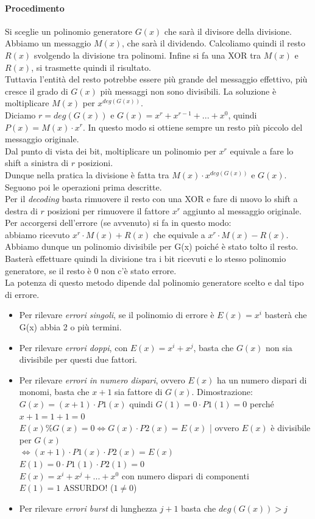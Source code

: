 \documentclass[10pt,a4paper,twoside]{article}
\begin{document}
\paragraph{Procedimento} Si sceglie un polinomio generatore $G(x)$ che sarà il divisore della divisione.\\
Abbiamo un messaggio $M(x)$, che sarà il dividendo. Calcoliamo quindi il resto $R(x)$ svolgendo la divisione tra polinomi. Infine si fa una XOR tra $M(x)$ e $R(x)$, si trasmette quindi il risultato.\\
Tuttavia l'entità del resto potrebbe essere più grande del messaggio effettivo, più cresce il grado di $G(x)$ più messaggi non sono divisibili. La soluzione è moltiplicare $M(x)$ per $x^{deg(G(x))}$.\\
Diciamo $r=deg(G(x))$ e $G(x)=x^r+x^{r-1}+...+x^0$, quindi $P(x)=M(x)\cdot x^r$. In questo modo si ottiene sempre un resto più piccolo del messaggio originale.\\
Dal punto di vista dei bit, moltiplicare un polinomio per $x^r$ equivale a fare lo shift a sinistra di $r$ posizioni.\\
Dunque nella pratica la divisione è fatta tra $M(x)\cdot x^{deg(G(x))}$ e $G(x)$. Seguono poi le operazioni prima descritte.\\
Per il \textit{decoding} basta rimuovere il resto con una XOR e fare di nuovo lo shift a destra di $r$ posizioni per rimuovere il fattore $x^r$ aggiunto al messaggio originale.\\
Per accorgersi dell'errore (se avvenuto) si fa in questo modo:\\
abbiamo ricevuto $x^r\cdot M(x)+R(x)$ che equivale a $x^r\cdot M(x)-R(x)$. Abbiamo dunque un polinomio divisibile per G(x) poiché è stato tolto il resto. Basterà effettuare quindi la divisione tra i bit ricevuti e lo stesso polinomio generatore, se il resto è 0 non c'è stato errore.\\
La potenza di questo metodo dipende dal polinomio generatore scelto e dal tipo di errore.
\begin{itemize}
\item Per rilevare \textit{errori singoli}, se il polinomio di errore è $E(x)=x^i$ basterà che G(x) abbia 2 o più termini.
\item Per rilevare \textit{errori doppi}, con $E(x)=x^i+x^j$, basta che $G(x)$ non sia divisibile per questi due fattori.
\item Per rilevare \textit{errori in numero dispari}, ovvero $E(x)$ ha un numero dispari di monomi, basta che $x+1$ sia fattore di $G(x)$. Dimostrazione:\\
$G(x)=(x+1)\cdot P1(x)$ quindi $G(1)=0\cdot P1(1)=0$ perché $x+1=1+1=0$\\
$E(x)\% G(x)=0 \iff G(x)\cdot P2(x)=E(x)$ | ovvero $E(x)$ è divisibile per $G(x)$\\
$\iff (x+1)\cdot P1(x)\cdot P2(x)=E(x)$\\
$E(1)=0\cdot P1(1) \cdot P2(1)=0$\\
$E(x)=x^i+x^j+...+x^0$ con numero dispari di componenti\\
$E(1)=1$ ASSURDO! ($1 \neq 0$)
\item Per rilevare \textit{errori burst} di lunghezza $j+1$ basta che $deg(G(x))>j$
\end{itemize}
\end{document}
